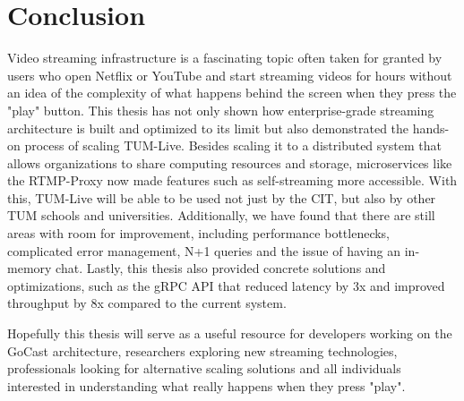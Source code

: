 
\chapter{Conclusion}\label{chapter:conclusion}

Video streaming infrastructure is a fascinating topic often taken for granted by users who open Netflix or YouTube and start streaming videos for hours without an idea of the complexity of what happens behind the screen when they press the "play" button. This thesis has not only shown how enterprise-grade streaming architecture is built and optimized to its limit but also demonstrated the hands-on process of scaling TUM-Live. Besides scaling it to a distributed system that allows organizations to share computing resources and storage, microservices like the RTMP-Proxy now made features such as self-streaming more accessible. With this, TUM-Live will be able to be used not just by the \ac{CIT}, but also by other \ac{TUM} schools and universities.
Additionally, we have found that there are still areas with room for improvement, including performance bottlenecks, complicated error management, N+1 queries and the issue of having an in-memory chat. Lastly, this thesis also provided concrete solutions and optimizations, such as the \ac{gRPC} \ac{API} that reduced latency by 3x and improved throughput by 8x compared to the current system. 

Hopefully this thesis will serve as a useful resource for developers working on the GoCast architecture, researchers exploring new streaming technologies, professionals looking for alternative scaling solutions and all individuals interested in understanding what really happens when they press "play".